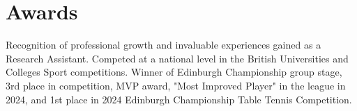 \section{Awards}
  \resumeSubHeadingListStart
      {Recognition of professional growth and invaluable experiences gained as a Research Assistant.}
      {Competed at a national level in the British Universities and Colleges Sport competitions.}
      {Winner of Edinburgh Championship group stage, 3rd place in competition, MVP award, "Most Improved Player" in the league in 2024, and 1st place in 2024 Edinburgh Championship Table Tennis Competition.}
  \resumeSubHeadingListEnd